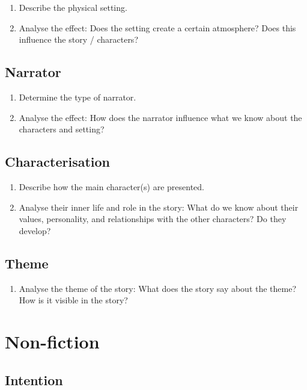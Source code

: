 \documentclass[11pt,a4paper,oneside]{book}
\begin{document}
\begin{enumerate}
\item Describe the physical setting.
\item Analyse the effect: Does the setting create a certain atmosphere? Does this influence the story / characters?
\end{enumerate}

\subsection*{Narrator}

\begin{enumerate}
\item Determine the type of narrator.
\item Analyse the effect: How does the narrator influence what we know about the characters and setting?
\end{enumerate}

\subsection*{Characterisation}

\begin{enumerate}
\item Describe how the main character(s) are presented.
\item Analyse their inner life and role in the story: What do we know about their values, personality, and relationships with the other characters? Do they develop?
\end{enumerate}

\subsection*{Theme}

\begin{enumerate}
\item Analyse the theme of the story: What does the story say about the theme? How is it visible in the story?
\end{enumerate}

\section*{Non-fiction}

\subsection*{Intention}
\end{document}

